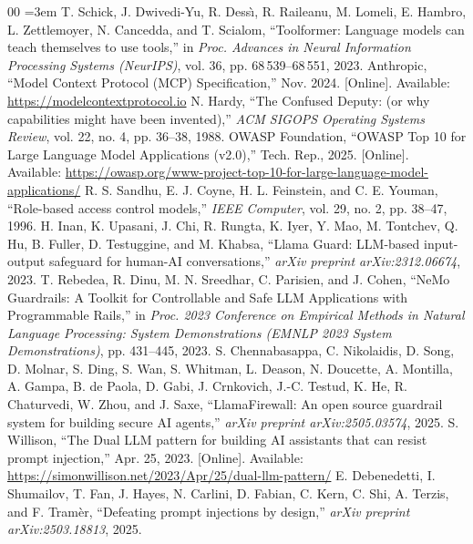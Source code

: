 \documentclass[conference,10pt]{IEEEtran}
\begin{document}
\begin{thebibliography}{00}
\sloppy\emergencystretch=3em\hfuzz=1pt
 T. Schick, J. Dwivedi-Yu, R. Dess{\`\i}, R. Raileanu, M. Lomeli, E. Hambro, L. Zettlemoyer, N. Cancedda, and T. Scialom, ``Toolformer: Language models can teach themselves to use tools,'' in \textit{Proc. Advances in Neural Information Processing Systems (NeurIPS)}, vol. 36, pp. 68\,539--68\,551, 2023.
 Anthropic, ``Model Context Protocol (MCP) Specification,'' Nov. 2024. [Online]. Available: \url{https://modelcontextprotocol.io}
 N. Hardy, ``The Confused Deputy: (or why capabilities might have been invented),'' \textit{ACM SIGOPS Operating Systems Review}, vol. 22, no. 4, pp. 36--38, 1988.
 OWASP Foundation, ``OWASP Top 10 for Large Language Model Applications (v2.0),'' Tech. Rep., 2025. [Online]. Available: \url{https://owasp.org/www-project-top-10-for-large-language-model-applications/}
 R. S. Sandhu, E. J. Coyne, H. L. Feinstein, and C. E. Youman, ``Role-based access control models,'' \textit{IEEE Computer}, vol. 29, no. 2, pp. 38--47, 1996.
 H. Inan, K. Upasani, J. Chi, R. Rungta, K. Iyer, Y. Mao, M. Tontchev, Q. Hu, B. Fuller, D. Testuggine, and M. Khabsa, ``Llama Guard: LLM-based input-output safeguard for human-AI conversations,'' \textit{arXiv preprint arXiv:2312.06674}, 2023.
 T. Rebedea, R. Dinu, M. N. Sreedhar, C. Parisien, and J. Cohen, ``NeMo Guardrails: A Toolkit for Controllable and Safe LLM Applications with Programmable Rails,'' in \textit{Proc. 2023 Conference on Empirical Methods in Natural Language Processing: System Demonstrations (EMNLP 2023 System Demonstrations)}, pp. 431--445, 2023.
 S. Chennabasappa, C. Nikolaidis, D. Song, D. Molnar, S. Ding, S. Wan, S. Whitman, L. Deason, N. Doucette, A. Montilla, A. Gampa, B. de Paola, D. Gabi, J. Crnkovich, J.-C. Testud, K. He, R. Chaturvedi, W. Zhou, and J. Saxe, ``LlamaFirewall: An open source guardrail system for building secure AI agents,'' \textit{arXiv preprint arXiv:2505.03574}, 2025.
 S. Willison, ``The Dual LLM pattern for building AI assistants that can resist prompt injection,'' Apr. 25, 2023. [Online]. Available: \url{https://simonwillison.net/2023/Apr/25/dual-llm-pattern/}
 E. Debenedetti, I. Shumailov, T. Fan, J. Hayes, N. Carlini, D. Fabian, C. Kern, C. Shi, A. Terzis, and F. Tram{\`e}r, ``Defeating prompt injections by design,'' \textit{arXiv preprint arXiv:2503.18813}, 2025.

\end{thebibliography}
\end{document}
